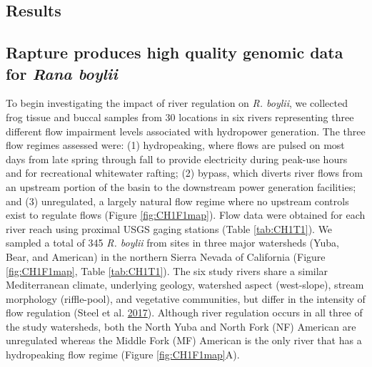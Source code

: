 \documentclass[proquest,12pt,final]{ucthesis-CA2012} %
\begin{document}
\begin{ucmainmatter}
\clearpage

\hypertarget{results}{%
\section{Results}\label{results}}

\hypertarget{rapture-produces-high-quality-genomic-data-for-rana-boylii}{%
\subsection{\texorpdfstring{Rapture produces high quality genomic data
for \emph{Rana
boylii}}{Rapture produces high quality genomic data for Rana boylii}}\label{rapture-produces-high-quality-genomic-data-for-rana-boylii}}

To begin investigating the impact of river regulation on \emph{R.
boylii}, we collected frog tissue and buccal samples from 30 locations
in six rivers representing three different flow impairment levels
associated with hydropower generation. The three flow regimes assessed
were: (1) hydropeaking, where flows are pulsed on most days from late
spring through fall to provide electricity during peak-use hours and for
recreational whitewater rafting; (2) bypass, which diverts river flows
from an upstream portion of the basin to the downstream power generation
facilities; and (3) unregulated, a largely natural flow regime where no
upstream controls exist to regulate flows (Figure \ref{fig:CH1F1map}).
Flow data were obtained for each river reach using proximal USGS gaging
stations (Table \ref{tab:CH1T1}). We sampled a total of 345 \emph{R.
boylii} from sites in three major watersheds (Yuba, Bear, and American)
in the northern Sierra Nevada of California (Figure \ref{fig:CH1F1map},
Table \ref{tab:CH1T1}). The six study rivers share a similar
Mediterranean climate, underlying geology, watershed aspect
(west-slope), stream morphology (riffle-pool), and vegetative
communities, but differ in the intensity of flow regulation (Steel et
al. \protect\hyperlink{ref-steel_associating_2017}{2017}). Although
river regulation occurs in all three of the study watersheds, both the
North Yuba and North Fork (NF) American are unregulated whereas the
Middle Fork (MF) American is the only river that has a hydropeaking flow
regime (Figure \ref{fig:CH1F1map}A).
\begin{table}[!h]


\end{table}
\end{ucmainmatter}
\end{document}
